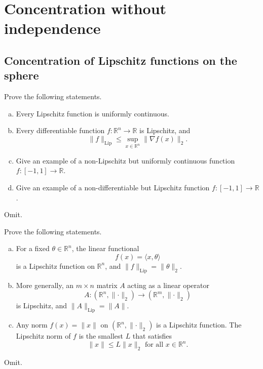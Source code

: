 \chapter{Concentration without independence}
\section{Concentration of Lipschitz functions on the sphere}
\begin{problem*}[Exercise 5.1.2]\label{ex5.1.2}
	Prove the following statements.
	\begin{enumerate}[(a)]
		\item\label{ex5.1.2:a} Every Lipschitz function is uniformly continuous.
		\item\label{ex5.1.2:b} Every differentiable function \(f \colon \mathbb{R} ^n \to \mathbb{R} \) is Lipschitz, and
		      \[
			      \lVert f \rVert _{\mathrm{Lip} }
			      \leq \sup _{x \in \mathbb{R} ^n} \lVert \nabla f(x) \rVert _2.
		      \]
		\item\label{ex5.1.2:c} Give an example of a non-Lipschitz but uniformly continuous function \(f\colon [-1, 1] \to \mathbb{R} \).
		\item\label{ex5.1.2:d} Give an example of a non-differentiable but Lipschitz function \(f \colon [-1, 1] \to \mathbb{R} \).
	\end{enumerate}
\end{problem*}
\begin{answer}
	Omit.
\end{answer}

\begin{problem*}[Exercise 5.1.3]\label{ex5.1.3}
	Prove the following statements.
	\begin{enumerate}[(a)]
		\item\label{ex5.1.3:a} For a fixed \(\theta \in \mathbb{R} ^n\), the linear functional
		      \[
			      f(x)
			      = \langle x, \theta  \rangle
		      \]
		      is a Lipschitz function on \(\mathbb{R} ^n\), and \(\lVert f \rVert _{\mathrm{Lip} } = \lVert \theta \rVert _2\).
		\item\label{ex5.1.3:b} More generally, an \(m \times n\) matrix \(A\) acting as a linear operator
		      \[
			      A \colon (\mathbb{R} ^n, \lVert \cdot \rVert _2) \to (\mathbb{R} ^m, \lVert \cdot \rVert _2)
		      \]
		      is Lipschitz, and \(\lVert A \rVert _{\mathrm{Lip} } = \lVert A \rVert \).
		\item\label{ex5.1.3:c} Any norm \(f(x) = \lVert x \rVert \) on \((\mathbb{R} ^n, \lVert \cdot \rVert _2)\) is a Lipschitz function. The Lipschitz norm of \(f\) is the smallest \(L\) that satisfies
		      \[
			      \lVert x \rVert
			      \leq L \lVert x \rVert _2 \text{ for all } x \in \mathbb{R} ^n.
		      \]
	\end{enumerate}
\end{problem*}
\begin{answer}
	Omit.
\end{answer}

